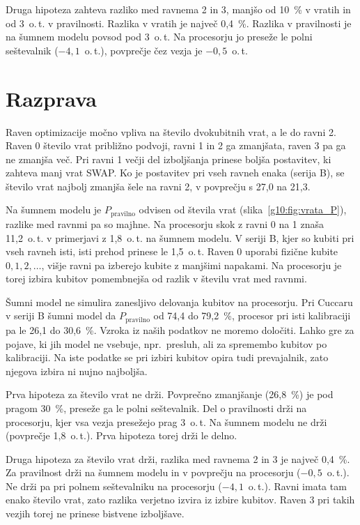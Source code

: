 \documentclass[graybox, envcountchap]{svmult}
\begin{document}
Druga hipoteza zahteva razliko med ravnema 2 in 3,
manjšo od 10~\% v vratih
in od 3~o.\,t. v pravilnosti.
Razlika v vratih je največ 0,4~\%.
Razlika v pravilnosti je na šumnem modelu
povsod pod 3~o.\,t.
Na procesorju jo preseže le polni seštevalnik ($-4{,}1$~o.\,t.),
povprečje čez vezja je $-0{,}5$~o.\,t.


\section{Razprava}
\label{g10:sec:razprava}

Raven optimizacije močno vpliva na število dvokubitnih vrat,
a le do ravni 2.
Raven 0 število vrat približno podvoji,
ravni 1 in 2 ga zmanjšata,
raven 3 pa ga ne zmanjša več.
Pri ravni 1 večji del izboljšanja prinese
boljša postavitev, ki zahteva manj vrat SWAP.
Ko je postavitev pri vseh ravneh enaka (serija B),
se število vrat najbolj zmanjša šele na ravni 2,
v povprečju s 27,0 na 21,3.

Na šumnem modelu je $P_\text{pravilno}$ odvisen od števila vrat
(slika~\ref{g10:fig:vrata_P}),
razlike med ravnmi pa so majhne.
Na procesorju skok z ravni 0 na 1 znaša 
11,2~o.\,t. v primerjavi z 1,8~o.\,t. na šumnem modelu.
V seriji B, kjer so kubiti pri vseh ravneh isti,
isti prehod prinese le 1,5~o.\,t.
Raven 0 uporabi fizične kubite $0, 1, 2, \ldots$,
višje ravni pa izberejo kubite z manjšimi napakami.
Na procesorju je torej izbira kubitov
pomembnejša od razlik v številu vrat med ravnmi.

Šumni model ne simulira zanesljivo delovanja kubitov
na procesorju.
Pri Cuccaru v seriji B šumni model da
$P_\text{pravilno}$ od 74,4 do 79,2~\%,
procesor pri isti kalibraciji pa le 26,1 do 30,6~\%.
Vzroka iz naših podatkov ne moremo določiti.
Lahko gre za pojave, ki jih model ne vsebuje,
npr.\ presluh, ali za spremembo kubitov po kalibraciji.
Na iste podatke se pri izbiri kubitov opira
tudi prevajalnik, zato njegova izbira ni nujno najboljša.

Prva hipoteza za število vrat ne drži.
Povprečno zmanjšanje (26,8~\%) je pod pragom 30~\%,
preseže ga le polni seštevalnik.
Del o pravilnosti drži na procesorju,
kjer vsa vezja presežejo prag 3~o.\,t.
Na šumnem modelu ne drži (povprečje 1,8~o.\,t.).
Prva hipoteza torej drži le delno.

Druga hipoteza za število vrat drži,
razlika med ravnema 2 in 3 je največ 0,4~\%.
Za pravilnost drži na šumnem modelu
in v povprečju na procesorju ($-0{,}5$~o.\,t.).
Ne drži pa pri polnem seštevalniku na procesorju ($-4{,}1$~o.\,t.).
Ravni imata tam enako število vrat,
zato razlika verjetno izvira iz izbire kubitov.
Raven 3 pri takih vezjih
torej ne prinese bistvene izboljšave.
\end{document}
